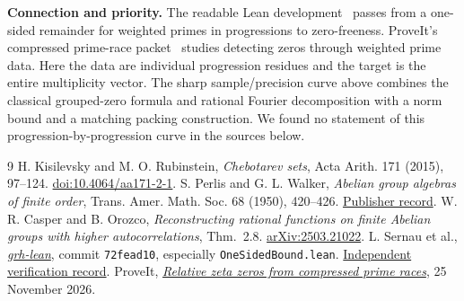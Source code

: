 \documentclass[11pt]{article}
\begin{document}
\smallskip
\noindent\textbf{Connection and priority.} The readable Lean development~\cite{lean} passes from a one-sided remainder for weighted primes in progressions to zero-freeness. ProveIt's compressed prime-race packet~\cite{proveit} studies detecting zeros through weighted prime data. Here the data are individual progression residues and the target is the entire multiplicity vector. The sharp sample/precision curve above combines the classical grouped-zero formula and rational Fourier decomposition with a norm bound and a matching packing construction. We found no statement of this progression-by-progression curve in the sources below.

\begin{thebibliography}{9}\small
{} H. Kisilevsky and M. O. Rubinstein, \emph{Chebotarev sets}, Acta Arith. 171 (2015), 97--124. \href{https://doi.org/10.4064/aa171-2-1}{doi:10.4064/aa171-2-1}.
 S. Perlis and G. L. Walker, \emph{Abelian group algebras of finite order}, Trans. Amer. Math. Soc. 68 (1950), 420--426. \href{https://doi.org/10.1090/S0002-9947-1950-0034758-3}{Publisher record}.
 W. R. Casper and B. Orozco, \emph{Reconstructing rational functions on finite Abelian groups with higher autocorrelations}, Thm.~2.8. \href{https://arxiv.org/abs/2503.21022}{arXiv:2503.21022}.
 L. Sernau et al., \href{https://github.com/lsernau/grh-lean/tree/72fead102f663d5c7a407964a13dc0cf9d977207}{\emph{grh-lean}}, commit \texttt{72fead10}, especially \texttt{OneSidedBound.lean}. \href{https://math.mit.edu/~drew/shortgrh/}{Independent verification record}.
 ProveIt, \href{https://github.com/VladimirReshetnikov/ProveIt/tree/main/Analysis/GeneralizedRiemannHypothesis/Research/grh_relative_prime_races_2026-11-25}{\emph{Relative zeta zeros from compressed prime races}}, 25 November 2026.
\end{thebibliography}
\end{document}

